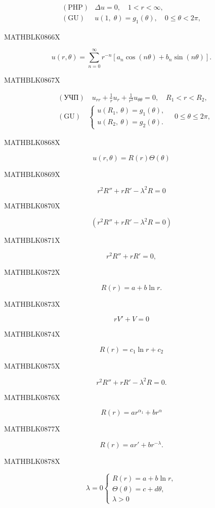\documentclass[
  ukrainian,
]{article}
\begin{document}
\[
\begin{array}{llll} (\text{PHP}) & \Delta u = 0, \quad 1 < r < \infty, \\ (\text{GU}) & u\left(1, \; \theta\right) = g_1\left(\theta\right), \quad 0 \leqslant \theta < 2\pi, \end{array}
\]

MATHBLK0866X

\[
u(r, \theta) = \sum_{n=0}^{\infty} r^{-n} [a_n \cos(n\theta) + b_n \sin(n\theta)].
\]

MATHBLK0867X

\[
\begin{aligned} & (\text{УЧП}) \quad u_{rr} + \frac{1}{r} u_r + \frac{1}{r^2} u_{\theta\theta} = 0, \quad R_1 < r < R_2, \\ & (\text{GU}) \quad \begin{cases} u(R_1, \ \theta) = g_1(\theta), \\ u(R_2, \ \theta) = g_2(\theta). \end{cases} \quad 0 \leqslant \theta \leqslant 2\pi, \end{aligned}
\]

MATHBLK0868X

\[
u(r, \theta) = R(r) \Theta(\theta)
\]

MATHBLK0869X

\[
r^2R'' + rR' - \lambda^2R = 0
\]

MATHBLK0870X

\[
(r^2R'' + rR' - \lambda^2R = 0)
\]

MATHBLK0871X

\[
r^2R'' + rR' = 0,
\]

MATHBLK0872X

\[
R(r) = a + b \ln r.
\]

MATHBLK0873X

\[
rV' + V = 0
\]

MATHBLK0874X

\[
R(r) = c_1 \ln r + c_2
\]

MATHBLK0875X

\[
r^2R'' + rR' - \lambda^2R = 0.
\]

MATHBLK0876X

\[
R(r) = ar^{\alpha_1} + br^{\alpha}
\]

MATHBLK0877X

\[
R(r) = ar' + br^{-\lambda}.
\]

MATHBLK0878X

\[
\lambda = 0 \begin{cases} R(r) = a + b \ln r, \\ \Theta(\theta) = c + d\theta, \\ \lambda > 0 \end{cases}
\]
\end{document}
